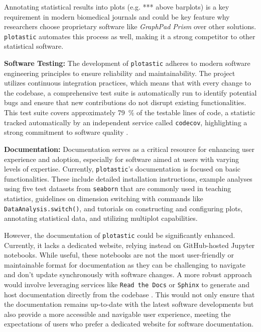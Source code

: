 Annotating statistical results into plots (e.g. *** above barplots) is a key
requirement in modern biomedical journals and could be key feature why
researchers choose proprietary software like \textit{GraphPad Prism} over
other solutions. \texttt{plotastic} automates this process as well, making
it a strong competitor to other statistical software.


\textbf{Software Testing:} The development of \texttt{plotastic} adheres to
modern software engineering principles to ensure reliability and
maintainability. The project utilizes continuous integration practices, which
means that with every change to the codebase, a comprehensive test suite is
automatically run to identify potential bugs and ensure that new contributions
do not disrupt existing functionalities. This test suite covers approximately
\SI{79}{\percent} of the testable lines of code, a statistic tracked
automatically by an independent service called \texttt{codecov}, highlighting a
strong commitment to software quality \cite{Codecov2024}.



\textbf{Documentation:}
Documentation serves as a critical resource for enhancing user experience and
adoption, especially for software aimed at users with varying levels of
expertise. Currently, \texttt{plotastic}'s documentation is focused on basic
functionalities. These include detailed installation instructions, example
analyses using five test datasets from \texttt{seaborn} that are commonly used
in teaching statistics, guidelines on dimension switching with commands like
\texttt{DataAnalysis.switch()}, and tutorials on constructing and configuring
plots, annotating statistical data, and utilizing multiplot capabilities.

However, the documentation of \texttt{plotastic} could be significantly
enhanced. Currently, it lacks a dedicated website, relying instead on
GitHub-hosted Jupyter notebooks. While useful, these notebooks are not the most
user-friendly or maintainable format for documentation as they can be
challenging to navigate and don't update synchronously with software changes. A
more robust approach would involve leveraging services like \texttt{Read the Docs}
or \texttt{Sphinx} to generate and host documentation directly from the codebase
\cite{ReadDocs2024, Sphinx2024}. This would not only ensure
that the documentation remains up-to-date with the latest software developments
but also provide a more accessible and navigable user experience, meeting the
expectations of users who prefer a dedicated website for software documentation.



